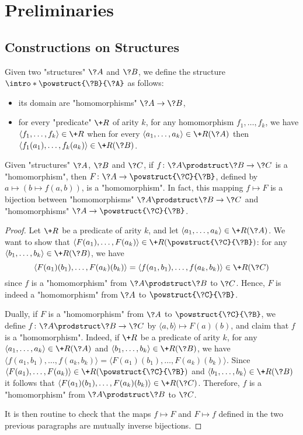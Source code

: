\section{\AP\label{sec:dichotomy-preliminaries}%
	Preliminaries}

\subsection{Constructions on Structures}

Given two "structures" $\?A$ and $\?B$, we define the structure \AP$\intro*\powstruct{\?B}{\?A}$ as follows:
\begin{itemize}
  \item its domain are "homomorphisms" $\?A \to \?B$,
  \item for every "predicate" $\+R$ of arity $k$, for any homomorphism $f_1,\hdots,f_k$,
  we have $\langle f_1,\hdots,f_k\rangle \in \+R$ when for every
  $\langle a_1,\hdots,a_k\rangle \in \+R(\?A)$
  then $\langle f_1(a_1), \hdots, f_k(a_k) \rangle \in \+R(\?B)$.
\end{itemize}


\begin{proposition}
	\AP\label{prop:currying-hom}
	Given "structures" $\?A$, $\?B$ and $\?C$, if $f\colon \?A\prodstruct \?B \to \?C$
	is a "homomorphism", then $F\colon \?A \to \powstruct{\?C}{\?B}$,
	defined by $a \mapsto (b \mapsto f(a,b))$, is a "homomorphism".
	In fact, this mapping $f \mapsto F$ is a bijection
	between "homomorphisms" $\?A\prodstruct \?B \to \?C$
	and "homomorphisms" $\?A \to \powstruct{\?C}{\?B}$.
\end{proposition}

\begin{proof}
Let $\+R$ be a predicate of arity $k$, and let
$\langle a_1,\hdots,a_k \rangle \in \+R(\?A)$.
We want to show that $\langle F(a_1),\hdots,F(a_k) \rangle \in \+R(\powstruct{\?C}{\?B})$:
for any $\langle b_1,\hdots,b_k \rangle \in \+R(\?B)$, we have
\[\langle F(a_1)(b_1), \hdots, F(a_k)(b_k)\rangle = \langle f(a_1,b_1),\hdots,f(a_k,b_k) \rangle \in \+R(\?C)\] since $f$ is a "homomorphism" from $\?A\prodstruct \?B$ to $\?C$.
Hence, $F$ is indeed a "homomorphism" from $\?A$ to $\powstruct{\?C}{\?B}$.

Dually, if $F$ is a "homomorphism" from $\?A$ to $\powstruct{\?C}{\?B}$,
we define $f\colon \?A\prodstruct \?B \to \?C$ by $\langle a,b \rangle \mapsto F(a)(b)$,
and claim that $f$ is a "homomorphism". Indeed, if $\+R$ be a predicate of arity $k$,
for any $\langle a_1, \hdots, a_k \rangle \in \+R(\?A)$
and $\langle b_1, \hdots, b_k \rangle \in \+R(\?B)$,
we have $\langle f(a_1,b_1), \hdots, f(a_k,b_k) \rangle
= \langle F(a_1)(b_1), \hdots, F(a_k)(b_k) \rangle$.
Since $\langle F(a_1), \hdots, F(a_k) \rangle \in \+R(\powstruct{\?C}{\?B})$
and $\langle b_1, \hdots,b_k \rangle \in \+R(\?B)$ 
it follows that $\langle F(a_1)(b_1), \hdots, F(a_k)(b_k) \rangle \in \+R(\?C)$.
Therefore, $f$ is a "homomorphism" from $\?A \prodstruct \?B$ to $\?C$.

It is then routine to check that the maps $f \mapsto F$ and $F \mapsto f$ defined
in the two previous paragraphs are mutually inverse bijections.
\end{proof}

